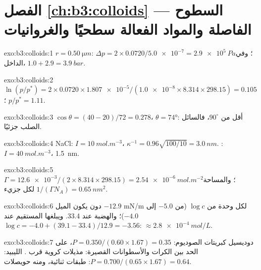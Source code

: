 \section*{الفصل \ref{ch:b3:colloids} --- السطوح الفاصلة والمواد الفعالة سطحيًا والغروانيات}

\begin{solution}{exo:b3:colloids:1}
$r = \qty{0.50}{\micro m}$: $\Delta p = 2 \times 0.0720/\num{5.0e-7} = \qty{2.9e5}{Pa}$؛ وفي الداخل، $1.0 + 2.9 = \qty{3.9}{bar}$.
\end{solution}

\begin{solution}{exo:b3:colloids:2}
$\ln(p/p^*) = 2 \times 0.0720 \times \num{1.807e-5}/(\num{1.0e-8} \times 8.314 \times 298.15) = 0.105$؛ $p/p^* = 1.11$.
\end{solution}

\begin{solution}{exo:b3:colloids:3}
$\cos\theta = (40 - 20)/72 = 0.278$، $\theta = \ang{74}$: أقل من $90^\circ$، فالسائل  الصلب
جزئيًا.
\end{solution}

\begin{solution}{exo:b3:colloids:4}
NaCl: $I = \qty{10}{mol.m^{-3}}$، $\kappa^{-1} = 0.96\sqrt{100/10} = \qty{3.0}{nm}$. : $I = \qty{40}{mol.m^{-3}}$، \qty{1.5}{nm}.
\end{solution}

\begin{solution}{exo:b3:colloids:5}
$\Gamma = \num{12.6e-3}/(2 \times 8.314 \times 298.15) = \qty{2.54e-6}{mol.m^{-2}}$؛ والمساحة $1/(\Gamma N_A) =
\qty{0.65}{nm^2}$ لكل جزيء.
\end{solution}

\begin{solution}{exo:b3:colloids:6}
دون  يكون الميل $-12.9$ \unit{mN/m} لكل وحدة من $\log c$ (من $-5.0$ إلى $-4.0$)؛ 
والهضبة عند 33.4. ويبلغها المستقيم عند $\log c = -4.0 + (39.1 - 33.4)/12.9 = -3.56$: 
$\approx \qty{2.8e-4}{mol/L}$.
\end{solution}

\begin{solution}{exo:b3:colloids:7}
دوديسيل كبريتات الصوديوم: $P = 0.350/(0.60 \times 1.67) = 0.35$، على الحد بين الكرات والأسطوانات
القصيرة: مذيلات كروية قرب . الليبيد: $P = 0.700/(0.65 \times 1.67) = 0.64$:
طبقات ثنائية، ومنه حويصلات.
\end{solution}

